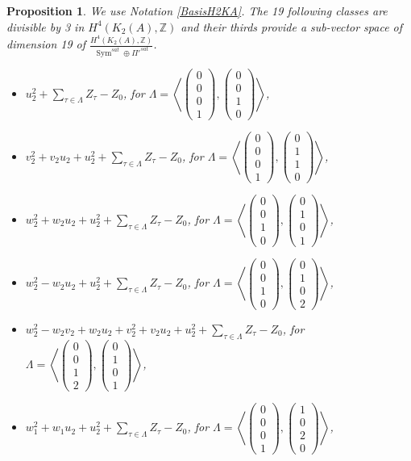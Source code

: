 \documentclass{alggeom}
\DeclareMathOperator{\Sym}{Sym}
\newcommand{\Z}{\mathbb{Z}}
\newcommand{\vect}[1]{\left( \begin{smallmatrix} #1 \end{smallmatrix} \right)}
\newcommand{\plan}[2]{\left< \vect{ #1 }, \vect{ #2 } \right>}
\theoremstyle{plain}
\newtheorem{prop}[theorem]{Proposition}
\theoremstyle{definition}
\theoremstyle{remark}
\begin{document}
\begin{prop}\label{XIX}
We use Notation \ref{BasisH2KA}.
The 19 following classes are divisible by 3 in $H^{4}(K_2(A),\Z)$ and their thirds provide a sub-vector space of dimension 19 of $\frac{H^4(K_2(A),\Z)}{\Sym^{sat}\oplus\Pi'^{sat}}$.
\begin{itemize}
\item[(i)]
$u_2^2+\sum_{\tau\in \Lambda} Z_\tau-Z_0$, for $\Lambda = \plan{0\\0\\0\\1}{0\\0\\1\\0}$,
\item[(ii)]
$v_2^2+v_2u_2+u_2^2+\sum_{\tau\in \Lambda} Z_\tau-Z_0$, for $\Lambda= \plan{0\\0\\0\\1}{0\\1\\1\\0}$,
\item[(iii)]
$w_2^2+w_2u_2+u_2^2+\sum_{\tau\in \Lambda} Z_\tau-Z_0$, for $\Lambda= \plan{0\\0\\1\\0}{0\\1\\0\\1}$,
\item[(iv)]
$w_2^2-w_2u_2+u_2^2+\sum_{\tau\in \Lambda} Z_\tau-Z_0$, for  $\Lambda= \plan{0\\0\\1\\0}{0\\1\\0\\2}$,
\item[(v)]
$w_2^2-w_2v_2+w_2u_2+v_2^2+v_2u_2+u_2^2+\sum_{\tau\in \Lambda} Z_\tau-Z_0$, for $\Lambda= \plan{0\\0\\1\\2}{0\\1\\0\\1}$,
\item[(vi)]
$w_1^2+w_1u_2+u_2^2+\sum_{\tau\in \Lambda} Z_\tau-Z_0$, for  $\Lambda= \plan{0\\0\\0\\1}{1\\0\\2\\0}$,

\end{itemize}
\end{prop}
\end{document}
